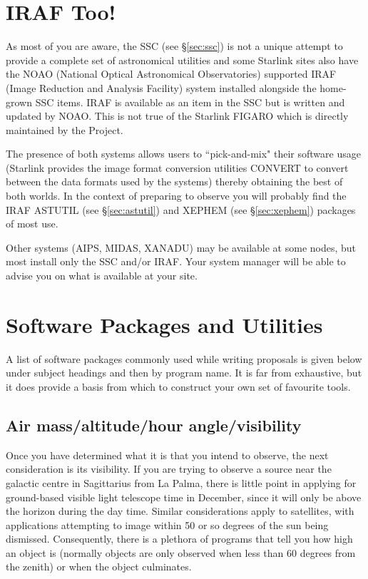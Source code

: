 \documentclass[twoside,11pt]{article}
\newcommand{\htmladdnormallink}[2]{#1}
\newcommand{\xref}[3]{#1}
\newcommand{\xlabel}[1]{}
\newcommand{\AIPSref}{\xref{AIPS}{sun207}{}}
\newcommand{\FIGAROref}{\xref{FIGARO}{sun86}{}}
\newcommand{\IRAFref}{\htmladdnormallink{IRAF}{http://star-www.rl.ac.uk/iraf/}}
\newcommand{\NOAOref}{\htmladdnormallink{NOAO}{http://www.noao.edu/}}
\newcommand{\MIDASref}{\htmladdnormallink{MIDAS}{http://http.hq.eso.org/midas-info/midas.html}}
\newcommand{\STARLINKref}{\htmladdnormallink{Starlink}{http://star-www.rl.ac.uk/}}
\newcommand{\CONVERTref}{\xref{CONVERT}{sun55}{}}
\newcommand{\SSCref}{\xref{SSC}{sun1}{}}
\newcommand{\XANADUref}{\htmladdnormallink{XANADU}{http://heasarc.gsfc.nasa.gov/docs/xanadu/xanadu.html}}
\begin{document}
\section{IRAF Too!} \xlabel{IRAF}
\label{sec:iraf}

As most of you are aware, the {\SSCref} (see \S{\ref{sec:ssc}}) is not a unique attempt to provide
a complete set of astronomical utilities and some {\STARLINKref} sites also have the 
{\NOAOref} (National Optical Astronomical Observatories) supported {\IRAFref} 
(Image Reduction and Analysis Facility) system installed alongside the home-grown SSC
items. IRAF is available as an item in the SSC but is written and updated
by NOAO. This is not true of the Starlink {\FIGAROref} which is directly maintained
by the Project. 

The presence of both systems allows users to ``pick-and-mix" their
software usage (Starlink provides the image format conversion utilities 
{\CONVERTref} to convert between the data formats used by the systems) 
thereby obtaining the best of both worlds. In the context
of preparing to observe you will probably find the IRAF ASTUTIL (see \S{\ref{sec:astutil}}) 
and XEPHEM (see \S{\ref{sec:xephem}}) packages of most use.

Other systems ({\AIPSref}, {\MIDASref}, {\XANADUref}) may be available
at some nodes, but most install only the SSC and/or IRAF. Your system manager
will be able to advise you on what is available at your site.


\section{Software Packages and Utilities} \xlabel{PACKAGES}
\label{sec:packages}
 
A list of software packages commonly used while writing proposals is given
below under subject headings and then by program name. It is far from 
exhaustive, but it does provide a basis from which to construct your own 
set of favourite tools. 

\subsection{Air mass/altitude/hour angle/visibility} \xlabel{AIRMASS}
\label{sec:airmass}

Once you have determined what it is that you intend to observe, the 
next consideration is its visibility. If you are trying to observe 
a source near the galactic centre in Sagittarius from La Palma, there is
little point in
applying for ground-based visible light telescope time in December, since 
it will only be above the horizon during the day time. Similar 
considerations apply to satellites, with applications attempting to image 
within 50 or so degrees of the sun being dismissed. Consequently,
there is a plethora of programs that tell you how high an object is
(normally objects are only observed when less than 60 degrees from the 
zenith) or when the object culminates.
\end{document}
